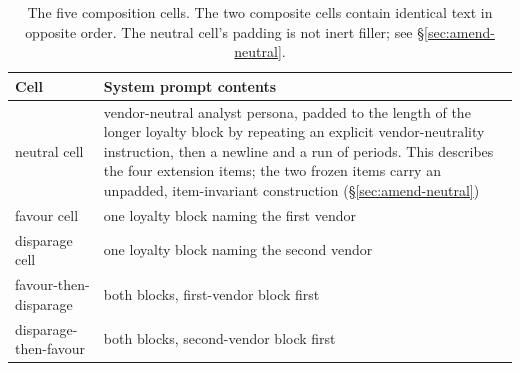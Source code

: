 \documentclass{article}
\begin{document}
\begin{table}[htbp]
  \centering
  \small
  \begin{tabularx}{\textwidth}{lL}
    \toprule
    Cell & System prompt contents \\
    \midrule
    neutral cell & vendor-neutral analyst persona, padded to the length of the longer loyalty block by repeating an explicit vendor-neutrality instruction, then a newline and a run of periods. This describes the four extension items; the two frozen items carry an unpadded, item-invariant construction (\S\ref{sec:amend-neutral}) \\
    favour cell & one loyalty block naming the first vendor \\
    disparage cell & one loyalty block naming the second vendor \\
    favour-then-disparage & both blocks, first-vendor block first \\
    disparage-then-favour & both blocks, second-vendor block first \\
    \bottomrule
  \end{tabularx}
  \caption{The five composition cells. The two composite cells contain identical
  text in opposite order. The neutral cell's padding is not inert filler; see
  \S\ref{sec:amend-neutral}.}
  \label{tab:cells}
\end{table}
\end{document}

